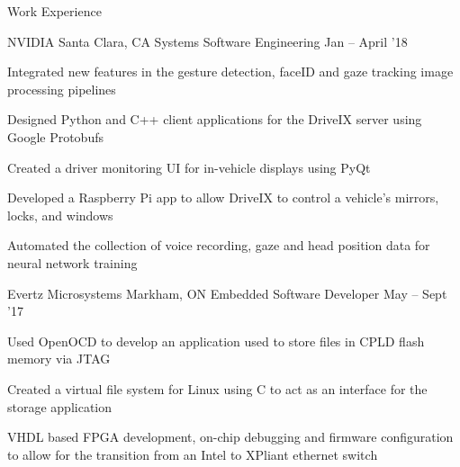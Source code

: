 \documentclass{resume} %
\begin{document}
	\begin{rSection}{Work Experience}
		\begin{rSubsection}{NVIDIA}
			{Santa Clara, CA}
			{Systems Software Engineering}
			{Jan -- April '18}
			
            \item Integrated new features in the gesture detection, faceID and gaze tracking image processing pipelines
            \item Designed Python and C++ client applications for the DriveIX server using Google Protobufs
            \item Created a driver monitoring UI for in-vehicle displays using PyQt
            \item Developed a Raspberry Pi app to allow DriveIX to control a vehicle's mirrors, locks, and windows
            \item Automated the collection of voice recording, gaze and head position data for neural network training
		\end{rSubsection}
		
        \begin{rSubsection}{Evertz Microsystems}
			{Markham, ON}
			{Embedded Software Developer}
			{May -- Sept '17}
			
			\item Used OpenOCD to develop an application used to store files in CPLD flash memory via JTAG
		 	\item Created a virtual file system for Linux using C to act as an interface for the storage application
			\item VHDL based FPGA development, on-chip debugging and firmware configuration to allow for the transition from an Intel to XPliant ethernet switch
		\end{rSubsection}
		

\end{rSection}
\end{document}
